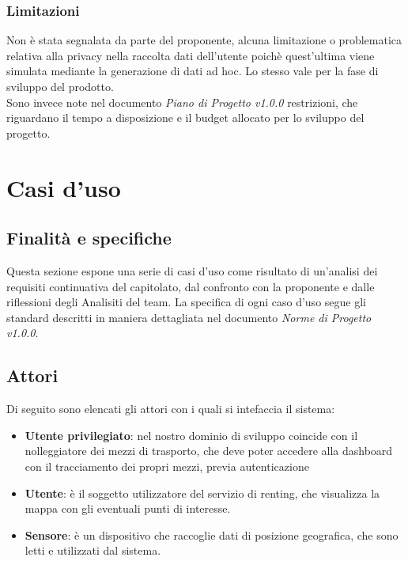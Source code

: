 \documentclass[11pt]{article}
\begin{document}
\begin{justify}
\subsubsection{Limitazioni}
Non è stata segnalata da parte del proponente, alcuna limitazione o problematica relativa alla privacy nella raccolta 
dati dell'utente poichè quest'ultima viene simulata mediante la generazione di dati ad hoc. Lo stesso vale per la fase 
di sviluppo del prodotto.
\\
Sono invece note nel documento \textit{Piano di Progetto v1.0.0} restrizioni, che riguardano il tempo a disposizione 
e il budget allocato per lo sviluppo del progetto. 
\newpage
\section{Casi d'uso}
\label{sec:casi-uso}

\subsection{Finalità e specifiche}
Questa sezione espone una serie di casi d'uso come risultato di un'analisi dei requisiti continuativa del capitolato, 
dal confronto con la proponente e dalle riflessioni degli Analisiti del team. La specifica di ogni caso d'uso segue 
gli standard descritti in maniera dettagliata nel documento \textit{Norme di Progetto v1.0.0}.

\subsection{Attori}
Di seguito sono elencati gli attori con i quali si intefaccia il sistema:
\begin{itemize}
    \item \textbf{Utente privilegiato}: nel nostro dominio di sviluppo coincide con il nolleggiatore dei mezzi di 
    trasporto, che deve poter accedere alla dashboard con il tracciamento dei propri mezzi, previa autenticazione
    \item \textbf{Utente}: è il soggetto utilizzatore del servizio di renting, che visualizza la mappa con gli 
    eventuali punti di interesse.
    \item \textbf{Sensore}: è un dispositivo che raccoglie dati di posizione geografica, che sono letti e utilizzati 
    dal sistema.
\end{itemize}

\end{justify}
\end{document}
